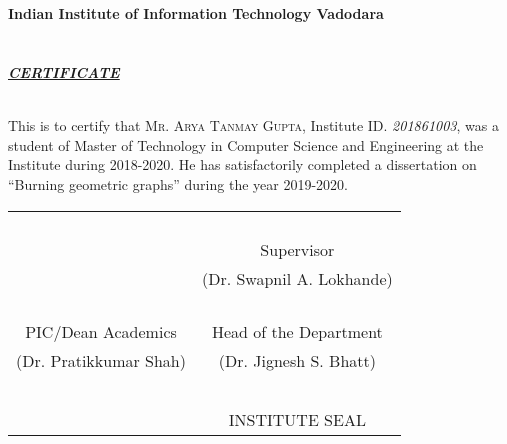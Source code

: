 \chapter*{}

\begin{center}
    {\Large\textbf{Indian Institute of Information Technology Vadodara}}\\~\\~\\
    \textbf{\textit{\underline{CERTIFICATE}}}\\~\\
\end{center}

This is to certify that \textsc{Mr. Arya Tanmay Gupta}, Institute ID. \textit{201861003}, was a student of Master of Technology in Computer Science and Engineering at the Institute during 2018-2020. He has satisfactorily completed a dissertation on ``Burning geometric graphs'' during the year 2019-2020.

\begin{table}[h]
    \centering
    \large
    \begin{tabular}{c c}
         & \\ & \\ & \\ & \\
         & Supervisor \\
         & (Dr. Swapnil A. Lokhande)\\
         & \\
         & \\
         & \\
         & \\
        PIC/Dean Academics & Head of the Department \\
        (Dr. Pratikkumar Shah) & (Dr. Jignesh S. Bhatt)\\
         & \\
         & \\
         & \\
         & \\
         & \\
         & INSTITUTE SEAL
    \end{tabular}
\end{table}